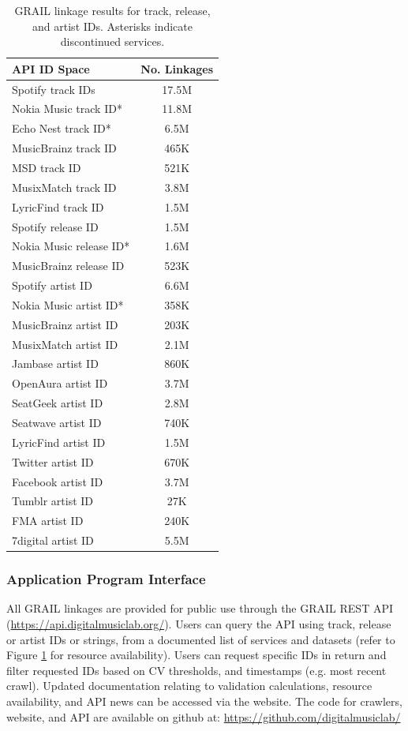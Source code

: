 \documentclass[a4paper]{article}
\begin{document}
\begin{table}
\centering
\begin{tabular}{|l|c|}
\hline
\textbf{API ID Space} & \textbf{No. Linkages}  \\
\hline
Spotify track IDs & 17.5M  \\
Nokia Music track ID* & 11.8M \\
Echo Nest track ID*  & 6.5M  \\
MusicBrainz track ID & 465K  \\
MSD track ID & 521K  \\
MusixMatch track ID & 3.8M \\
LyricFind track ID & 1.5M  \\
\hline
Spotify release ID & 1.5M  \\
Nokia Music release ID*  & 1.6M \\
MusicBrainz release ID & 523K  \\ 
\hline
Spotify artist ID & 6.6M  \\
Nokia Music artist ID* & 358K \\
MusicBrainz artist ID & 203K  \\
MusixMatch artist ID & 2.1M  \\
Jambase artist ID & 860K  \\
OpenAura artist ID & 3.7M  \\
SeatGeek artist ID & 2.8M  \\
Seatwave artist ID & 740K  \\
LyricFind artist ID & 1.5M  \\
Twitter artist ID & 670K  \\
Facebook artist ID & 3.7M  \\
Tumblr artist ID & 27K  \\
FMA artist ID & 240K  \\
7digital artist ID & 5.5M  \\
\hline
\end{tabular}
\caption[Linkage Results]{\Gls{GRAIL} linkage results for track, release, and artist IDs. Asterisks indicate discontinued services.}
\label{tab:results}
\end{table}

\subsubsection{Application Program Interface}
All \Gls{GRAIL} linkages are provided for public use through the \Gls{GRAIL} REST \Gls{API} (\url{https://api.digitalmusiclab.org/}). Users can query the \Gls{API} using track, release or artist IDs or strings, from a documented list of services and datasets (refer to Figure \ref{tab:results} for resource availability). Users can request specific IDs in return and filter requested IDs based on CV thresholds, and timestamps (e.g. most recent crawl). Updated documentation relating to validation calculations, resource availability, and API news can be accessed via the website. The code for crawlers, website, and \Gls{API} are available on github at: \url{https://github.com/digitalmusiclab/}
\end{document}
